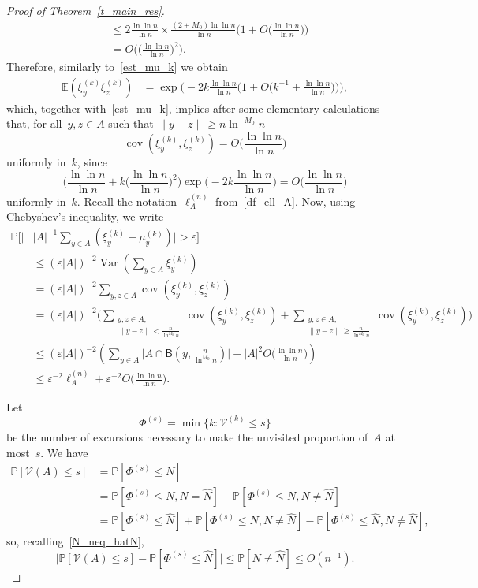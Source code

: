 \documentclass[AHL,Unicode,longabstracts]{cedram}
\DeclareMathOperator{\cov}{cov}
\DeclareMathOperator{\Var}{Var}
\newcommand{\1}[1]{{\mathbf 1}{\{#1\}}}
\newcommand{\eps}{\varepsilon}
\newcommand{\V}{{\mathcal V}}
\newcommand{\hN}{{\widehat N}}
\newcommand{\8}{{\infty}}
\newcommand{\IP}{{\mathbb P}}
\newcommand{\IE}{{\mathbb E}}
\newcommand{\B}{{\mathsf B}}
\begin{document}
\begin{proof}[Proof of Theorem~\ref{t_main_res}]
\begin{align*}
&\leq 2\frac{\ln\ln n}{\ln n} \times \frac{(2+M_0)\ln\ln n}{\ln n}
\Big(1+O\Big(\frac{\ln\ln n}{\ln n}\Big)\Big)\\
&= O\Big(\Big(\frac{\ln\ln n}{\ln n}\Big)^2\Big).
\end{align*}
Therefore, similarly to~\eqref{est_mu_k} we obtain
\begin{align*}
\IE(\xi_y^{(k)}\xi_z^{(k)}) &= \exp\Big(-2k\frac{\ln\ln n}{\ln n}
\Big(1+O\Big(k^{-1}+\frac{\ln\ln n}{\ln n}\Big)\Big)\Big),
\end{align*}
which, together with~\eqref{est_mu_k}, implies after some elementary calculations that, for all~$y,z\in A$ such that $\|y-z\|\geq n\ln^{-M_0}n$
\begin{equation}\label{est_cov}
\cov (\xi_y^{(k)},\xi_z^{(k)}) = O\Big(\frac{\ln\ln n}{\ln n}\Big)
\end{equation}
uniformly in~$k$, since
\[
\Bigg(\frac{\ln\ln n}{\ln n} + k\Big(\frac{\ln\ln n}{\ln n}\Big)^2
\Bigg) \exp\Big(-2k\frac{\ln\ln n}{\ln n}\Big) = O\Big(\frac{\ln\ln n}{\ln n}\Big)
\]
uniformly in~$k$. Recall the notation~$\ell^{(n)}_A$ from~\eqref{df_ell_A}. Now, using Chebyshev's inequality, we write
\begin{align}
\IP\Big[\Big|&|A|^{-1}\sum_{y\in A}(\xi_y^{(k)} -\mu_y^{(k)})\Big|>\eps\Big]\nonumber\\
&\leq (\eps|A|)^{-2} \Var \left(\sum_{y\in A}\xi_y^{(k)}\right)
\nonumber\\
&= (\eps|A|)^{-2} \sum_{y,z\in A}\cov (\xi_y^{(k)},\xi_z^{(k)})
\nonumber\\
&= (\eps|A|)^{-2} \Bigg(\sum_{\substack{y,z\in A,\\
\|y-z\|< \frac{n}{\ln^{M_0}n}}} \cov (\xi_y^{(k)},\xi_z^{(k)}) + \sum_{\substack{y,z\in A,\\
\|y-z\|\geq \frac{n}{\ln^{M_0}n}}}
\cov (\xi_y^{(k)},\xi_z^{(k)}) \Bigg)
\nonumber\\
&\leq (\eps|A|)^{-2} \left(\sum_{y\in A} \big|A\cap \B(y,\tfrac{n}{\ln^{M_0}n})\big| + |A|^2 O\Big(\frac{\ln\ln n}{\ln n}\Big) \right)\nonumber\\
&\leq \eps^{-2}
\ell^{(n)}_A + \eps^{-2} O\Big(\frac{\ln\ln n}{\ln n} \Big).\label{bigcalc_Cheb}
\end{align}

Let
\[
\Phi^{(s)} = \min\big\{k: \V^{(k)}\leq s\big\}
\]
be the number of excursions necessary to make the unvisited proportion of~$A$ at most~$s$. We have
\begin{align*}
\IP[\V(A)\leq s] & = \IP[\Phi^{(s)}\leq N]\\
&= \IP[\Phi^{(s)}\leq N,N=\hN] +
\IP[\Phi^{(s)}\leq N,N\neq \hN]\\
&= \IP[\Phi^{(s)}\leq \hN] + \IP[\Phi^{(s)}\leq N,N\neq \hN] - \IP[\Phi^{(s)}\leq \hN,N\neq \hN],
\end{align*}
so, recalling~\eqref{N_neq_hatN},
\begin{equation}\label{V_Phi_hatN}
\big|\IP[\V(A)\leq s] - \IP[\Phi^{(s)}\leq \hN]\big|
\leq \IP[N\neq \hN] \leq O(n^{-1}).
\end{equation}


\end{proof}
\end{document}

